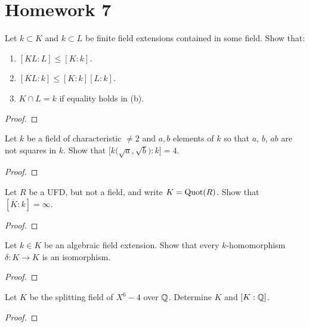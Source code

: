 \chapter{Homework 7}
\begin{problem}
Let $k\subset K$ and $k\subset L$ be finite field extensions contained in
some field. Show that:
\begin{enumerate}[label=(\alph*)]
\item $[KL:L]\leq [K:k]$.
\item $[KL:k]\leq [K:k][L:k]$.
\item $K\cap L=k$ if equality holds in (b).
\end{enumerate}
\end{problem}
\begin{proof}
\end{proof}

\begin{problem}
Let $k$ be a field of characteristic $\neq 2$ and $a,b$ elements of $k$ so
that $a$, $b$, $ab$ are not squares in $k$. Show that
$\bigl[k\bigl(\sqrt{a},\sqrt{b}\bigr):k\bigr]=4$.
\end{problem}
\begin{proof}
\end{proof}

\begin{problem}
Let $R$ be a UFD, but not a field, and write $K=\operatorname{Quot}(R)$. Show that
$[\overline K:k]=\infty$.
\end{problem}
\begin{proof}
\end{proof}

\begin{problem}
Let $k\in K$ be an algebraic field extension. Show that every
$k$-homomorphism $\delta\colon K\to K$ is an isomorphism.
\end{problem}
\begin{proof}
\end{proof}

\begin{problem}
Let $K$ be the splitting field of $X^6-4$ over $\mathbb{Q}$. Determine $K$ and
$[K:\mathbb{Q}]$.
\end{problem}
\begin{proof}
\end{proof}

